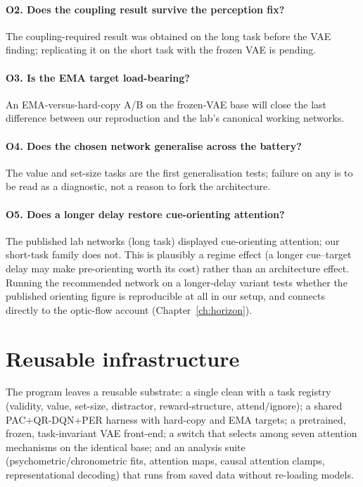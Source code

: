 \paragraph{O2. Does the coupling result survive the perception fix?} The
coupling-required result was obtained on the long task before the VAE finding; replicating
it on the short task with the frozen VAE is pending.

\paragraph{O3. Is the EMA target load-bearing?} An EMA-versus-hard-copy A/B on the
frozen-VAE base will close the last difference between our reproduction and the lab's
canonical working networks.

\paragraph{O4. Does the chosen network generalise across the battery?} The value and
set-size tasks are the first generalisation tests; failure on any is to be read as a
diagnostic, not a reason to fork the architecture.

\paragraph{O5. Does a longer delay restore cue-orienting attention?} The published lab
networks (long task) displayed cue-orienting attention; our short-task family does not. This
is plausibly a regime effect (a longer cue--target delay may make pre-orienting worth its
cost) rather than an architecture effect. Running the recommended  network on
a longer-delay variant tests whether the published orienting figure is reproducible at all
in our setup, and connects directly to the optic-flow account (Chapter~\ref{ch:horizon}).

\section{Reusable infrastructure}
The program leaves a reusable substrate: a single clean  with a
task registry (validity, value, set-size, distractor, reward-structure, attend/ignore); a
shared PAC$+$QR-DQN$+$PER harness with hard-copy and EMA targets; a pretrained, frozen,
task-invariant VAE front-end; a  switch that selects among seven attention
mechanisms on the identical base; and an analysis suite (psychometric/chronometric fits,
attention maps, causal attention clamps, representational decoding) that runs from saved
data without re-loading models.
